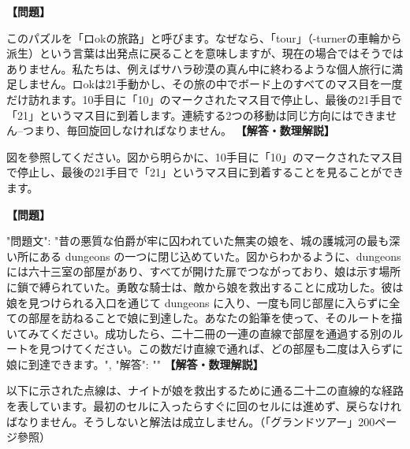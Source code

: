 \documentclass[10pt,a4paper,oneside,openany]{ltjsbook}
\begin{document}
\begin{tcolorbox}[colback=softblue,colframe=primaryblue,title=\textbf{第 321 問：ロokの旅路 （原題: THE ROOK'S JOURNEY.）},arc=2mm,boxrule=1pt,breakable]
\textbf{【問題】}\par\vspace{0.3em}
このパズルを「ロokの旅路」と呼びます。なぜなら、「tour」（-turnerの車輪から派生）という言葉は出発点に戻ることを意味しますが、現在の場合ではそうではありません。私たちは、例えばサハラ砂漠の真ん中に終わるような個人旅行に満足しません。ロokは21手動かし、その旅の中でボード上のすべてのマス目を一度だけ訪れます。10手目に「10」のマークされたマス目で停止し、最後の21手目で「21」というマス目に到着します。連続する2つの移動は同じ方向にはできません--つまり、毎回旋回しなければなりません。
\tcblower
\textbf{【解答・数理解説】}\par\vspace{0.3em}
図を參照してください。図から明らかに、10手目に「10」のマークされたマス目で停止し、最後の21手目で「21」というマス目に到着することを見ることができます。
\end{tcolorbox}

\begin{tcolorbox}[colback=softblue,colframe=primaryblue,title=\textbf{第 322 問：THE LANGUISHING MAIDEN.},arc=2mm,boxrule=1pt,breakable]
\textbf{【問題】}\par\vspace{0.3em}
{
    "問題文": "昔の悪質な伯爵が牢に囚われていた無実の娘を、城の護城河の最も深い所にある dungeons の一つに閉じ込めていた。図からわかるように、dungeons には六十三室の部屋があり、すべてが開けた扉でつながっており、娘は示す場所に鎖で縛られていた。勇敢な騎士は、敵から娘を救出することに成功した。彼は娘を見つけられる入口を通じて dungeons に入り、一度も同じ部屋に入らずに全ての部屋を訪ねることで娘に到達した。あなたの鉛筆を使って、そのルートを描いてみてください。成功したら、二十二冊の一連の直線で部屋を通過する別のルートを見つけてください。この数だけ直線で通れば、どの部屋も二度は入らずに娘に到達できます。",
    "解答": ""
}
\tcblower
\textbf{【解答・数理解説】}\par\vspace{0.3em}
以下に示された点線は、ナイトが娘を救出するために通る二十二の直線的な経路を表しています。最初のセルに入ったらすぐに回のセルには進めず、戻らなければなりません。そうしないと解法は成立しません。（「グランドツアー」200ページ參照）
\end{tcolorbox}
\end{document}
